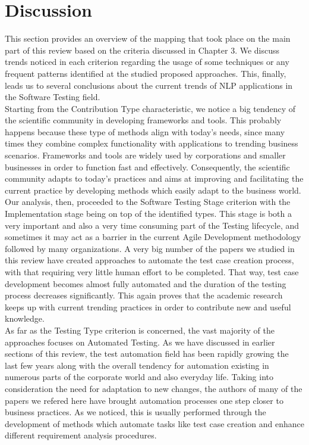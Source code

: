 \chapter{Discussion}

This section provides an overview of the mapping that took place on the main part of this review based on the criteria discussed in Chapter 3. We discuss trends noticed 
in each criterion regarding the usage of some techniques or any frequent patterns identified at the studied proposed approaches. This, finally, leads us to several conclusions 
about the current trends of NLP applications in the Software Testing field.\\

Starting from the Contribution Type characteristic, we notice a big tendency of the scientific community in developing frameworks and tools. This probably happens because 
these type of methods align with today's needs, since many times they combine complex functionality with applications to trending business scenarios. Frameworks and tools are 
widely used by corporations and smaller businesses in order to function fast and effectively. Consequently, the scientific community adapts to today's practices and aims at 
improving and facilitating the current practice by developing methods which easily adapt to the business world.\\

Our analysis, then, proceeded to the Software Testing Stage criterion with the Implementation stage being on top of the identified types. This stage is both a very important and 
also a very time consuming part of the Testing lifecycle, and sometimes it may act as a barrier in the current Agile Development methodology followed by many organizations. A very 
big number of the papers we studied in this review have created approaches to automate the test case creation process, with that requiring very little human effort to be completed. 
That way, test case development becomes almost fully automated and the duration of the testing process decreases significantly. This again proves that the academic research keeps 
up with current trending practices in order to contribute new and useful knowledge.\\

As far as the Testing Type criterion is concerned, the vast majority of the approaches focuses on Automated Testing. As we have discussed in earlier sections of this review, the test automation 
field has been rapidly growing the last few years along with the overall tendency for automation existing in numerous parts of the corporate world and also everyday life. Taking into consideration 
the need for adaptation to new changes, the authors of many of the papers we refered here have brought automation processes one step closer to business practices. As we noticed, this is usually performed through 
the development of methods which automate tasks like test case creation and enhance different requirement analysis procedures.\\

